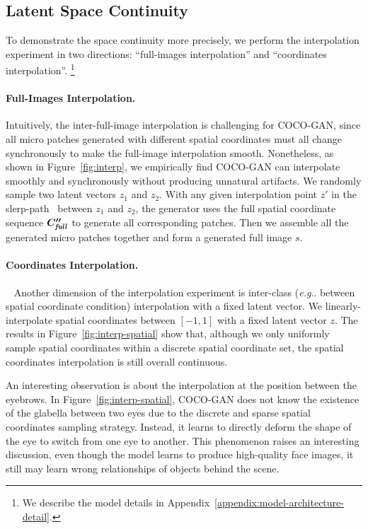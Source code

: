 \documentclass{article}
\makeatletter
\newcommand{\modelName}{COCO-GAN }
\newcommand{\modelNamePunc}{COCO-GAN}
\newcommand\blfootnote[1]{\begingroup
  \renewcommand\thefootnote{}\footnote{#1}\addtocounter{footnote}{-1}\endgroup
}
\DeclareRobustCommand\onedot{\futurelet\@let@token\@onedot}
\def\@onedot{\ifx\@let@token.\else.\null\fi\xspace}
\def\eg{\emph{e.g}\onedot} \def\Eg{\emph{E.g}\onedot}
\makeatother
\begin{document}
    \subsection{Latent Space Continuity} 
    
        To demonstrate the space continuity more precisely, we perform the interpolation experiment in two directions: ``full-images interpolation'' and ``coordinates interpolation''. \blfootnote{\vspace{-1em} We describe the model details in Appendix~\ref{appendix:model-architecture-detail}.}
        
        \paragraph{Full-Images Interpolation.} Intuitively, the inter-full-image interpolation is challenging for \modelNamePunc, since all micro patches generated with different spatial coordinates must all change synchronously to make the full-image interpolation smooth. Nonetheless, as shown in Figure~\ref{fig:interp}, we empirically find \modelName can interpolate smoothly and synchronously without producing unnatural artifacts. We randomly sample two latent vectors $z_1$ and $z_2$. With any given interpolation point $z'$ in the slerp-path~\cite{slerp-interpolation} between $z_1$ and $z_2$, the generator uses the full spatial coordinate sequence $\bm{C''}_{\textbf{\textit{full}}}$ to generate all corresponding patches. Then we assemble all the generated micro patches together and form a generated full image $s$.
        
        \paragraph{Coordinates Interpolation.}~\label{exp:interp-spatial} Another dimension of the interpolation experiment is inter-class (\eg between spatial coordinate condition) interpolation with a fixed latent vector. We linearly-interpolate spatial coordinates between $[-1, 1]$ with a fixed latent vector $z$. The results in Figure~\ref{fig:interp-spatial} show that, although we only uniformly sample spatial coordinates within a discrete spatial coordinate set, the spatial coordinates interpolation is still overall continuous. 
        
        An interesting observation is about the interpolation at the position between the eyebrows. In Figure~\ref{fig:interp-spatial}, \modelName does not know the existence of the glabella between two eyes due to the discrete and sparse spatial coordinates sampling strategy. Instead, it learns to directly deform the shape of the eye to switch from one eye to another. This phenomenon raises an interesting discussion, even though the model learns to produce high-quality face images, it still may learn wrong relationships of objects behind the scene.
        
\end{document}
